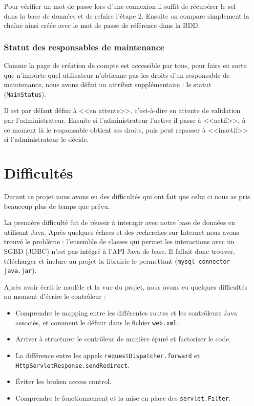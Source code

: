 Pour vérifier un mot de passe lors d'une connexion il suffit de récupérer le sel dans la base
de données et de refaire l'étape 2. Ensuite on compare simplement la chaîne ainsi créée avec le
mot de passe de référence dans la BDD.

\subsection{Statut des responsables de maintenance}

Comme la page de création de compte est accessible par tous, pour faire en sorte que n'importe
quel utilisateur n'obtienne pas les droits d'un responsable de maintenance, nous avons défini
un attribut supplémentaire : le statut (\verb:MainStatus:).

Il est par défaut défini à <<en attente>>, c'est-à-dire en attente de validation par
l'administrateur. Ensuite si l'administrateur l'active il passe à <<actif>>, à ce moment là le
responsable obtient ses droits, puis peut repasser à <<inactif>> si l'administrateur le décide.

\chapter{Difficultés}

Durant ce projet nous avons eu des difficultés qui ont fait que celui ci nous as pris beaucoup
plus de temps que prévu.\newline

La première difficulté fut de réussir à interagir avec notre base de données en utilisant Java.
Après quelques échecs et des recherches sur Internet nous avons trouvé le problème : l'ensemble
de classes qui permet les interactions avec un SGBD (JDBC) n'est pas intégré à l'API Java de
base. Il fallait donc trouver, télécharger et inclure au projet la librairie le permettant
(\verb:mysql-connector-java.jar:).\newline

Après avoir écrit le modèle et la vue du projet, nous avons eu quelques difficultés au moment
d'écrire le contrôleur :
\begin{itemize}
    \item Comprendre le mapping entre les différentes routes et les contrôleurs Java associés,
        et comment le définir dans le fichier \verb:web.xml:.
    \item Arriver à structurer le contrôleur de manière épuré et factoriser le code.
    \item La différence entre les appels \verb:requestDispatcher.forward: et\\
        \verb:HttpServletResponse.sendRedirect:.
    \item Éviter les broken access control.
    \item Comprendre le fonctionnement et la mise en place des \verb:servlet.Filter:.
\end{itemize}
\medskip

